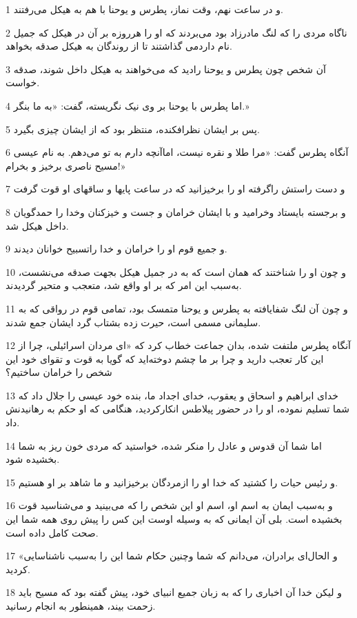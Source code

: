 \par 1 و در ساعت نهم، وقت نماز، پطرس و یوحنا با هم به هیکل می‌رفتند.
\par 2 ناگاه مردی را که لنگ مادرزاد بود می‌بردند که او را هرروزه بر آن در هیکل که جمیل نام داردمی گذاشتند تا از روندگان به هیکل صدقه بخواهد.
\par 3 آن شخص چون پطرس و یوحنا رادید که می‌خواهند به هیکل داخل شوند، صدقه خواست.
\par 4 اما پطرس با یوحنا بر وی نیک نگریسته، گفت: «به ما بنگر.»
\par 5 پس بر ایشان نظرافکنده، منتظر بود که از ایشان چیزی بگیرد.
\par 6 آنگاه پطرس گفت: «مرا طلا و نقره نیست، اماآنچه دارم به تو می‌دهم. به نام عیسی مسیح ناصری برخیز و بخرام!»
\par 7 و دست راستش راگرفته او را برخیزانید که در ساعت پایها و ساقهای او قوت گرفت
\par 8 و برجسته بایستاد وخرامید و با ایشان خرامان و جست و خیزکنان وخدا را حمدگویان داخل هیکل شد.
\par 9 و جمیع قوم او را خرامان و خدا راتسبیح خوانان دیدند.
\par 10 و چون او را شناختند که همان است که به در جمیل هیکل بجهت صدقه می‌نشست، به‌سبب این امر که بر او واقع شد، متعجب و متحیر گردیدند.
\par 11 و چون آن لنگ شفایافته به پطرس و یوحنا متمسک بود، تمامی قوم در رواقی که به سلیمانی مسمی است، حیرت زده بشتاب گرد ایشان جمع شدند.
\par 12 آنگاه پطرس ملتفت شده، بدان جماعت خطاب کرد که «ای مردان اسرائیلی، چرا از این کار تعجب دارید و چرا بر ما چشم دوخته‌اید که گویا به قوت و تقوای خود این شخص را خرامان ساختیم؟
\par 13 خدای ابراهیم و اسحاق و یعقوب، خدای اجداد ما، بنده خود عیسی را جلال داد که شما تسلیم نموده، او را در حضور پیلاطس انکارکردید، هنگامی که او حکم به رهانیدنش داد.
\par 14 اما شما آن قدوس و عادل را منکر شده، خواستید که مردی خون ریز به شما بخشیده شود.
\par 15 و رئیس حیات را کشتید که خدا او را ازمردگان برخیزانید و ما شاهد بر او هستیم.
\par 16 و به‌سبب ایمان به اسم او، اسم او این شخص را که می‌بینید و می‌شناسید قوت بخشیده است. بلی آن ایمانی که به وسیله اوست این کس را پیش روی همه شما این صحت کامل داده است.
\par 17 «و الحال‌ای برادران، می‌دانم که شما وچنین حکام شما این را به‌سبب ناشناسایی کردید.
\par 18 و لیکن خدا آن اخباری را که به زبان جمیع انبیای خود، پیش گفته بود که مسیح باید زحمت بیند، همینطور به انجام رسانید.
